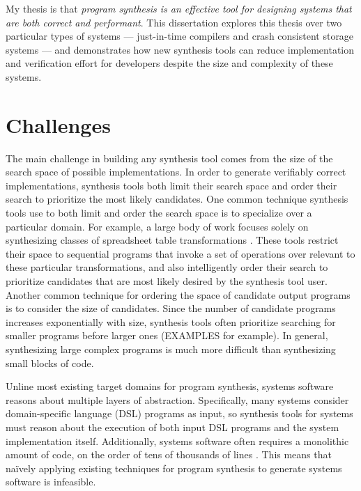 
My thesis is that \textit{program
synthesis is an effective tool for designing systems that are both correct and
performant}.  This dissertation explores this thesis over two particular types
of systems --- just-in-time compilers and crash consistent storage systems ---
and demonstrates how new synthesis tools can reduce implementation and verification
effort for developers despite the size and complexity of these systems.


\section{Challenges}

The main challenge in building any synthesis tool comes from the size of the
search space of possible implementations.
In order to generate verifiably correct implementations, synthesis tools both limit
their search space and order their search to prioritize the most likely candidates.
One common technique synthesis tools use to both limit and order the search space is
to specialize over a particular domain.
For example, a large body of work focuses solely on synthesizing classes of spreadsheet
table transformations .
These tools restrict their space to sequential programs that invoke a set
of operations over relevant to these particular transformations, and also intelligently
order their search to prioritize candidates that are most likely desired by the synthesis
tool user.
Another common technique for ordering the space of candidate output programs is to
consider the size of candidates.
Since the number of candidate programs increases exponentially with size,
synthesis tools often prioritize searching for smaller programs before larger ones
(EXAMPLES for example).
In general, synthesizing large complex programs is much more difficult than
synthesizing small blocks of code.


Unline most existing target domains for program synthesis, systems software reasons
about multiple layers of abstraction.
Specifically, many systems consider domain-specific language (DSL) programs as input,
so synthesis tools for systems must reason about the execution of both input DSL programs
and the system implementation itself.
Additionally, systems software
often requires a monolithic amount of code, on the order of tens of thousands
of lines .
This means that na\"ively applying existing techniques for program synthesis to generate
systems software is infeasible.

